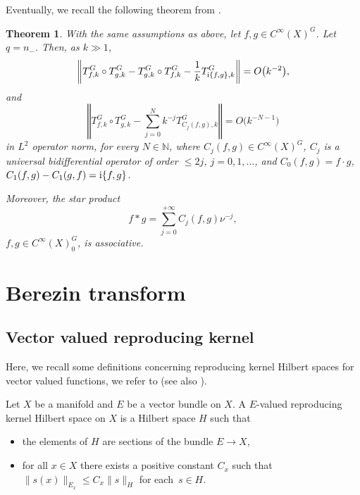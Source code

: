\documentclass[pdftex]{sigma}
\numberwithin{equation}{section}
\newtheorem{Theorem}{Theorem}[section]
\newcommand{\norm}[1]{\left\Vert#1\right\Vert}
\begin{document}
Eventually, we recall the following theorem from \cite{gh}.
	
	 \begin{Theorem} \label{thm:compositionFouriercomponents}
	 	With the same assumptions as above, let $f, g\in{C}^\infty(X)^G$. Let $q=n_-$. Then, as $k\gg1$,
	 	\[%
	 		\norm{T^G_{f,k}\circ T^G_{g,k}-T^G_{g,k}\circ T^G_{f,k}-\frac{1}{k} T^G_{ {\rm i} \{f,g\},k}}=O\bigl(k^{-2}\bigr),\]
	 	and
	 	\[%
	 		\norm{T^G_{f,k}\circ T^G_{g,k}-\sum^N_{j=0}k^{-j} T^G_{C_j(f,g),k}}=O\bigl(k^{-N-1}\bigr)
	 	\]
	 	in $L^2$ operator norm, for every $N\in\mathbb N$, where $C_j(f,g)\in{C}^\infty(X)^G$,
	 	$C_j$ is a universal bidifferential operator of order $\leq 2j$, $j=0,1,\dots$, and
$C_{0}(f,g)=f\cdot g $, $
	 			C_{1}(f,g)-C_{1}(g,f)= {\rm i} \{f,g\}$.
	 	
	 	Moreover, the star product
	 	\[%
	 		f*g= \sum_{j=0}^{+\infty} C_{j}(f,g) \nu^{-j} ,
	 	\]
	 	$f, g\in{C}^\infty(X)^G_0$, is associative.
	 \end{Theorem}

\section{Berezin transform}
	
\subsection{Vector valued reproducing kernel}
	
Here, we recall some definitions concerning reproducing kernel Hilbert spaces for vector valued functions, we refer to \cite{bm,pe} (see also \cite[Section~2]{cvt}).
	
\begin{Definition}Let $X$ be a manifold and $E$ be a vector bundle on $X$. A $E$-valued reproducing kernel Hilbert space on $X$ is a Hilbert space $H$ such that
		\begin{itemize}\itemsep=0pt
			\item[(1)] the elements of $H$ are sections of the bundle $E\rightarrow X$,
			\item[(2)] for all $x\in X$ there exists a positive constant $C_x$ such that
			$\lVert s(x)\rVert_{E_x} \leq C_x \lVert s\rVert_H $ for each~${s\in H}$.
		\end{itemize}
	\end{Definition}
	
\end{document}
